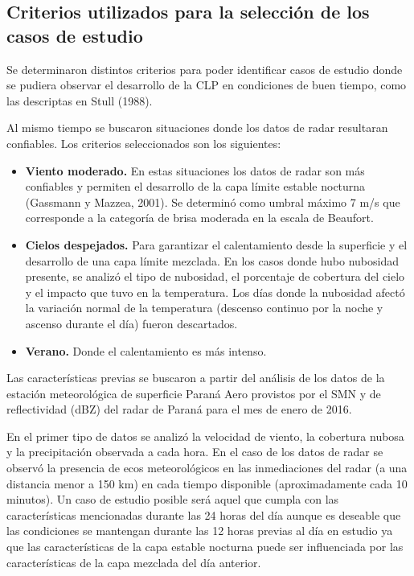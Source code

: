 \documentclass[12pt,spanish,oneside, a4paper]{book}
\providecommand{\tightlist}{%
  \setlength{\itemsep}{0pt}\setlength{\parskip}{0pt}}
\begin{document}
\subsection{\texorpdfstring{Criterios utilizados para la selección de
los casos de estudio
\label{sec-criterios}}{Criterios utilizados para la selección de los casos de estudio }}\label{criterios-utilizados-para-la-seleccion-de-los-casos-de-estudio}

Se determinaron distintos criterios para poder identificar casos de
estudio donde se pudiera observar el desarrollo de la CLP en condiciones
de buen tiempo, como las descriptas en Stull (1988).

Al mismo tiempo se buscaron situaciones donde los datos de radar
resultaran confiables. Los criterios seleccionados son los siguientes:

\begin{itemize}
\tightlist
\item
  \textbf{Viento moderado.} En estas situaciones los datos de radar son
  más confiables y permiten el desarrollo de la capa límite estable
  nocturna (Gassmann y Mazzea, 2001). Se determinó como umbral máximo 7
  m/s que corresponde a la categoría de brisa moderada en la escala de
  Beaufort.
\item
  \textbf{Cielos despejados.} Para garantizar el calentamiento desde la
  superficie y el desarrollo de una capa límite mezclada. En los casos
  donde hubo nubosidad presente, se analizó el tipo de nubosidad, el
  porcentaje de cobertura del cielo y el impacto que tuvo en la
  temperatura. Los días donde la nubosidad afectó la variación normal de
  la temperatura (descenso continuo por la noche y ascenso durante el
  día) fueron descartados.
\item
  \textbf{Verano.} Donde el calentamiento es más intenso.
\end{itemize}

Las características previas se buscaron a partir del análisis de los
datos de la estación meteorológica de superficie Paraná Aero provistos
por el SMN y de reflectividad (dBZ) del radar de Paraná para el mes de
enero de 2016.

En el primer tipo de datos se analizó la velocidad de viento, la
cobertura nubosa y la precipitación observada a cada hora. En el caso de
los datos de radar se observó la presencia de ecos meteorológicos en las
inmediaciones del radar (a una distancia menor a 150 km) en cada tiempo
disponible (aproximadamente cada 10 minutos). Un caso de estudio posible
será aquel que cumpla con las características mencionadas durante las 24
horas del día aunque es deseable que las condiciones se mantengan
durante las 12 horas previas al día en estudio ya que las
características de la capa estable nocturna puede ser influenciada por
las características de la capa mezclada del día anterior.
\end{document}
